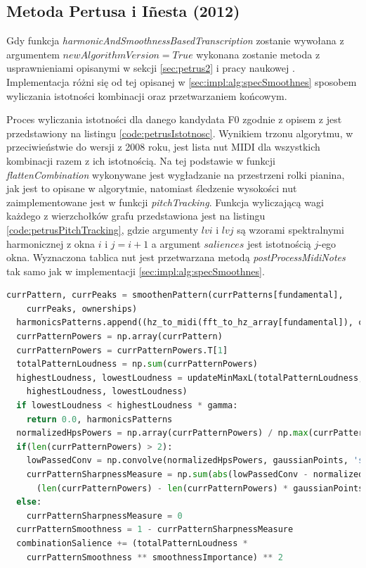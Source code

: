 \documentclass[12pt,a4paper,twoside]{mwart}
\begin{document}
\subsection{Metoda Pertusa i Iñesta (2012)}\label{sec:impl:alg:specSmoothnes:improved}
Gdy funkcja \textit{harmonicAndSmoothnessBasedTranscription} zostanie wywołana z argumentem $newAlgorithmVersion = True$ wykonana zostanie metoda z usprawnieniami opisanymi w sekcji \ref{sec:petrus2} i pracy naukowej \cite{Transcription:Pertus:Inharmonicity2}. Implementacja różni się od tej opisanej w \ref{sec:impl:alg:specSmoothnes} sposobem wyliczania istotności kombinacji oraz przetwarzaniem końcowym.  

Proces wyliczania istotności dla danego kandydata F0 zgodnie z opisem z \cite{Transcription:Pertus:Inharmonicity2} jest przedstawiony na listingu \ref{code:petrusIstotnosc}. Wynikiem trzonu algorytmu, w przeciwieństwie do wersji z 2008 roku, jest lista nut MIDI dla wszystkich kombinacji razem z ich istotnością. Na tej podstawie w funkcji \textit{flattenCombination} wykonywane jest wygładzanie na przestrzeni rolki pianina, jak jest to opisane w algorytmie, natomiast śledzenie wysokości nut zaimplementowane jest w funkcji \textit{pitchTracking}. Funkcja wyliczającą wagi każdego z wierzchołków grafu przedstawiona jest na listingu \ref{code:petrusPitchTracking}, gdzie argumenty $lvi$ i $lvj$ są wzorami spektralnymi harmonicznej z okna $i$ i $j = i + 1$ a argument $saliences$ jest istotnością $j$-ego okna. Wyznaczona tablica nut jest przetwarzana metodą \textit{postProcessMidiNotes} tak samo jak w implementacji \ref{sec:impl:alg:specSmoothnes}.

\begin{lstlisting}[language=Python, caption={Wyliczanie istotności w algorytmie Pertusa i Iñesta (2012)}, captionpos=b, label={code:petrusIstotnosc}, numbers=none]
  currPattern, currPeaks = smoothenPattern(currPatterns[fundamental],
    currPeaks, ownerships)
  harmonicsPatterns.append((hz_to_midi(fft_to_hz_array[fundamental]), currPattern))
  currPatternPowers = np.array(currPattern)
  currPatternPowers = currPatternPowers.T[1]
  totalPatternLoudness = np.sum(currPatternPowers)
  highestLoudness, lowestLoudness = updateMinMaxL(totalPatternLoudness,
    highestLoudness, lowestLoudness)
  if lowestLoudness < highestLoudness * gamma:
    return 0.0, harmonicsPatterns
  normalizedHpsPowers = np.array(currPatternPowers) / np.max(currPatternPowers)
  if(len(currPatternPowers) > 2):
    lowPassedConv = np.convolve(normalizedHpsPowers, gaussianPoints, 'same')
    currPatternSharpnessMeasure = np.sum(abs(lowPassedConv - normalizedHpsPowers)) /
      (len(currPatternPowers) - len(currPatternPowers) * gaussianPoints[1])
  else:
    currPatternSharpnessMeasure = 0
  currPatternSmoothness = 1 - currPatternSharpnessMeasure
  combinationSalience += (totalPatternLoudness *
    currPatternSmoothness ** smoothnessImportance) ** 2
\end{lstlisting}
\end{document}
